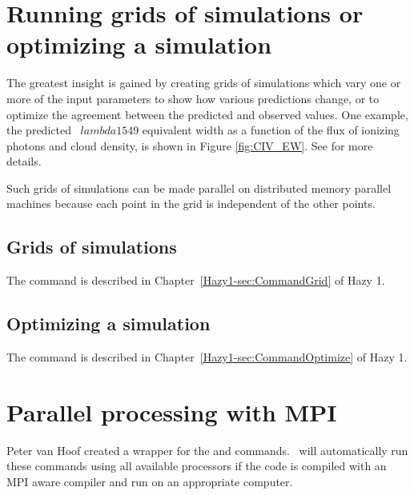 \section{Running grids of simulations or optimizing a simulation}

The greatest insight is gained by creating grids of simulations
which vary one or more of the input parameters to show how
various predictions change, or to optimize the agreement between the
predicted and observed values.
One example, the predicted \civ\ $lambda 1549$ equivalent width as a
function of the flux of ionizing photons and cloud density,
is shown in Figure \ref{fig:CIV_EW}.
See \citet{BaldwinEtAl95} for more details.

Such grids of simulations can be made parallel on distributed memory
parallel machines because each point in the grid is independent of the
other points.

\subsection{Grids of simulations}

The  command is described in
Chapter~\ref{Hazy1-sec:CommandGrid}
 of Hazy 1.

\subsection{Optimizing a simulation}

The  command is described in
Chapter~\ref{Hazy1-sec:CommandOptimize}
 of Hazy 1.


\section{Parallel processing with MPI}
\label{sec:ParallelMPI}

Peter van Hoof created a wrapper for the 
 and  commands.
\Cloudy\ will automatically run these commands using
all available processors if the code is compiled with 
an MPI aware compiler and run on an appropriate computer.
